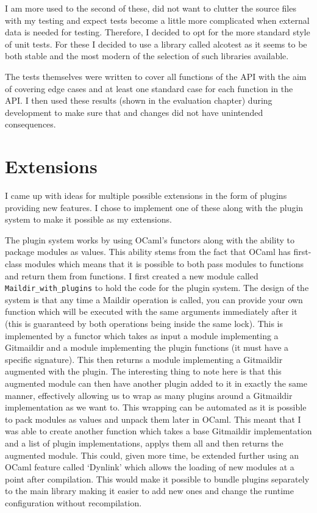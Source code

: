 I am more used to the second of these, did not want to clutter the source files with my testing and expect tests become a little more complicated when external data is needed for testing. Therefore, I decided to opt for the more standard style of unit tests. For these I decided to use a library called alcotest\cite{code_alcotest} as it seems to be both stable and the most modern of the selection of such libraries available.

The tests themselves were written to cover all functions of the API with the aim of covering edge cases and at least one standard case for each function in the API. I then used these results (shown in the evaluation chapter) during development to make sure that and changes did not have unintended consequences.

\section{Extensions} \label{section:extensions}

I came up with ideas for multiple possible extensions in the form of plugins providing new features. I chose to implement one of these along with the plugin system to make it possible as my extensions.

The plugin system works by using OCaml's functors along with the ability to package modules as values. This ability stems from the fact that OCaml has first-class modules which means that it is possible to both pass modules to functions and return them from functions. I first created a new module called \texttt{Maildir\_with\_plugins} to hold the code for the plugin system. The design of the system is that any time a Maildir operation is called, you can provide your own function which will be executed with the same arguments immediately after it (this is guaranteed by both operations being inside the same lock). This is implemented by a functor which takes as input a module implementing a Gitmaildir and a module implementing the plugin functions (it must have a specific signature). This then returns a module implementing a Gitmaildir augmented with the plugin. The interesting thing to note here is that this augmented module can then have another plugin added to it in exactly the same manner, effectively allowing us to wrap as many plugins around a Gitmaildir implementation as we want to. This wrapping can be automated as it is possible to pack modules as values and unpack them later in OCaml. This meant that I was able to create another function which takes a base Gitmaildir implementation and a list of plugin implementations, applys them all and then returns the augmented module. This could, given more time, be extended further using an OCaml feature called `Dynlink' which allows the loading of new modules at a point after compilation. This would make it possible to bundle plugins separately to the main library making it easier to add new ones and change the runtime configuration without recompilation.

